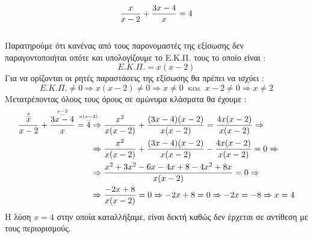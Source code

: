 \documentclass[twoside,nofonts,internet,methodoi]{thewria}
\DeclareRobustCommand{\frac}[3][0pt]{%
{\begingroup\hspace{#1}#2\hspace{#1}\endgroup\over\hspace{#1}#3\hspace{#1}}}
\begin{document}
{\boldmath\[ \frac{x}{x-2}+\frac{3x-4}{x}=4 \]}
\lysh\\
Παρατηρούμε ότι κανένας από τους παρονομαστές της εξίσωσης δεν παραγοντοποιήται οπότε και υπολογίζουμε το Ε.Κ.Π. τους το οποίο είναι :
\[ E.K.\varPi.=x(x-2) \]
Για να ορίζονται οι ρητές παραστάσεις της εξίσωσης θα πρέπει να ισχύει :
\[ E.K.\varPi.\neq0\Rightarrow x(x-2)\neq0\Rightarrow x\neq0\ \textrm{ και }\ x-2\neq0\Rightarrow x\neq2 \]
Μετατρέποντας όλους τους όρους σε ομώνυμα κλάσματα θα έχουμε :
\begin{align*}
\accentset{x}{\accentset{\smile}{\frac{x}{x-2}}}+\accentset{x-2}{\accentset{\smile}{\frac{3x-4}{x}}}=\accentset{x(x-2)}{\accentset{\smile}{4}}&\Rightarrow \frac{x^2}{x(x-2)}+\frac{(3x-4)(x-2)}{x(x-2)}=\frac{4x(x-2)}{x(x-2)}\Rightarrow\\
&\Rightarrow\frac{x^2}{x(x-2)}+\frac{(3x-4)(x-2)}{x(x-2)}-\frac{4x(x-2)}{x(x-2)}=0\Rightarrow\\
&\Rightarrow \frac{x^2+3x^2-6x-4x+8-4x^2+8x}{x(x-2)}=0\Rightarrow\\
&\Rightarrow \frac{-2x+8}{x(x-2)}=0\Rightarrow -2x+8=0\Rightarrow -2x=-8 \Rightarrow x=4
\end{align*}
Η λύση $ x=4 $ στην οποία καταλλήξαμε, είναι δεκτή καθώς δεν έρχεται σε αντίθεση με τους περιορισμούς.
\end{document}
